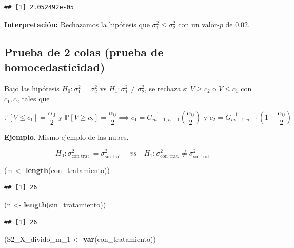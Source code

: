 \documentclass[
  12pt,
]{book}
\newenvironment{Shaded}{\begin{snugshade}}{\end{snugshade}}
\newcommand{\DecValTok}[1]{\textcolor[rgb]{0.00,0.00,0.81}{#1}}
\newcommand{\KeywordTok}[1]{\textcolor[rgb]{0.13,0.29,0.53}{\textbf{#1}}}
\newcommand{\NormalTok}[1]{#1}
\newcommand{\StringTok}[1]{\textcolor[rgb]{0.31,0.60,0.02}{#1}}
\begin{document}
\begin{verbatim}
## [1] 2.052492e-05
\end{verbatim}

\textbf{Interpretación:} Rechazamos la hipótesis que \(\sigma_{1}^{2} \leq \sigma_{2}^{2}\) con un valor-\(p\) de 0.02.

\hypertarget{prueba-de-2-colas-prueba-de-homocedasticidad}{%
\subsection{Prueba de 2 colas (prueba de homocedasticidad)}\label{prueba-de-2-colas-prueba-de-homocedasticidad}}

Bajo las hipótesis \(H_0: \sigma^2_1=\sigma^2_2\) vs
\(H_1: \sigma^2_1\ne\sigma^2_2\), se rechaza si \(V\geq c_2\) o \(V\leq c_1\) con
\(c_1,c_2\) tales que

\[\mathbb P[V\leq c_1] = \dfrac{\alpha_0}{2} \text{ y } \mathbb P[V\geq c_2] =
\dfrac{\alpha_0}{2} \implies c_1 =
G_{m-1,n-1}^{-1}\left(\dfrac{\alpha_0}{2}\right) \text{ y } c_2 =
G_{m-1,n-1}^{-1}\left(1-\dfrac{\alpha_0}{2}\right)\]

\textbf{Ejemplo}. Mismo ejemplo de las nubes.

\[
H_0: \sigma^{2}_{\text{con trat.}} = \sigma^{2}_{\text{sin trat.}} \quad
vs \quad
H_1: \sigma^{2}_{\text{con trat.}} \neq \sigma^{2}_{\text{sin trat.}} 
\]

\begin{Shaded}
\begin{Highlighting}[]
\NormalTok{(m \textless{}{-}}\StringTok{ }\KeywordTok{length}\NormalTok{(con\_tratamiento))}
\end{Highlighting}
\end{Shaded}

\begin{verbatim}
## [1] 26
\end{verbatim}

\begin{Shaded}
\begin{Highlighting}[]
\NormalTok{(n \textless{}{-}}\StringTok{ }\KeywordTok{length}\NormalTok{(sin\_tratamiento))}
\end{Highlighting}
\end{Shaded}

\begin{verbatim}
## [1] 26
\end{verbatim}

\begin{Shaded}
\begin{Highlighting}[]
\NormalTok{(S2\_X\_divido\_m\_}\DecValTok{1}\NormalTok{ \textless{}{-}}\StringTok{ }\KeywordTok{var}\NormalTok{(con\_tratamiento))}
\end{Highlighting}
\end{Shaded}
\end{document}
